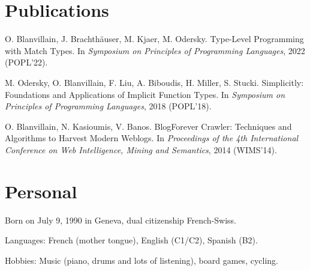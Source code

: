 \documentclass[marginmode, 11pt]{res}
\renewcommand{\:}[0]{:~}
\begin{document}
\begin{resume}
\section{Publications}


O. Blanvillain, J. Brachthäuser, M. Kjaer, M. Odersky. Type-Level Programming with Match Types. In \emph{Symposium on Principles of Programming Languages}, 2022 (POPL'22).

M. Odersky, O. Blanvillain, F. Liu, A. Biboudis, H. Miller, S. Stucki. Simplicitly: Foundations and Applications of Implicit Function Types. In \emph{Symposium on Principles of Programming Languages}, 2018 (POPL'18).

O. Blanvillain, N. Kasioumis, V. Banos. BlogForever Crawler: Techniques and Algorithms to Harvest Modern Weblogs. In \emph{Proceedings of the 4th International Conference on Web Intelligence, Mining and Semantics}, 2014 (WIMS'14).

\section{Personal}

Born on July 9, 1990 in Geneva, dual citizenship French-Swiss.

Languages: French (mother tongue), English (C1/C2), Spanish (B2).

Hobbies: Music (piano, drums and lots of listening), board
games, cycling.

\end{resume}
\end{document}
